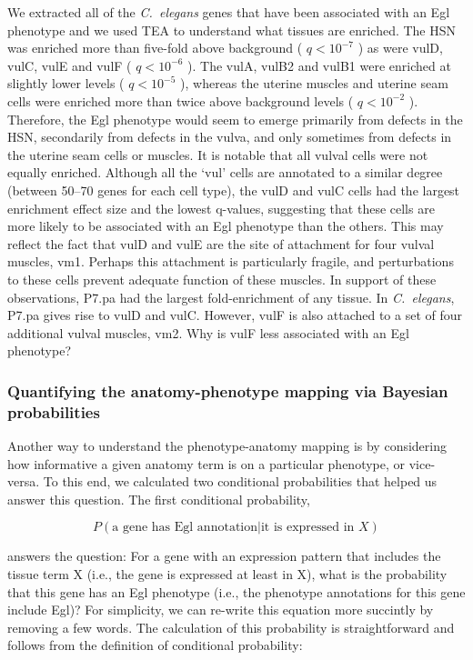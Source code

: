 \documentclass[10pt,letterpaper,twocolumn]{article}
\newcommand{\cel}{\emph{C.~elegans}}
\newcommand{\qval}[1]{
                      \ensuremath{
                                  q<10^{-#1}
                                  }
                      }
\begin{document}
We extracted all of the \cel{} genes that have been associated with an Egl
phenotype and we used TEA to understand what tissues are enriched. The HSN
was enriched more than five-fold above background (\qval{7}) as were vulD, vulC,
vulE and vulF (\qval{6}). The vulA, vulB2 and vulB1 were
enriched at slightly lower levels (\qval{5}), whereas the uterine muscles and
uterine seam cells were enriched more than twice above background levels
(\qval{2}).
Therefore, the Egl phenotype would seem to emerge primarily from defects in the
HSN, secondarily from defects in the vulva, and only sometimes from defects in the
uterine seam cells or muscles. It is notable that all vulval cells were not equally
enriched. Although all the `vul' cells are annotated to a similar degree (between
50--70 genes for each cell type), the vulD and vulC cells had the largest
enrichment effect size and the lowest q-values, suggesting that these cells
are more likely to be associated with an Egl phenotype than the others. This may
reflect the fact that vulD and vulE are the site of attachment for four vulval
muscles, vm1. Perhaps this attachment is particularly fragile, and perturbations
to these cells prevent adequate function of these muscles. In support of these
observations, P7.pa had the largest fold-enrichment of any tissue. In \cel{},
P7.pa gives rise to vulD and vulC. However, vulF is
also attached to a set of four additional vulval muscles, vm2. Why
is vulF less associated with an Egl phenotype?

\subsubsection*{Quantifying the anatomy-phenotype
                mapping via Bayesian probabilities}
Another way to understand the phenotype-anatomy mapping is by considering
how informative a given anatomy term is on a particular phenotype, or vice-versa.
To this end, we calculated two conditional probabilities that helped us answer
this question. The first conditional probability,

\begin{equation}
  P( \text{a gene has Egl annotation} | \text{it is expressed in } X)
\end{equation}

answers the question: For a gene with an expression pattern that includes the
tissue term X (i.e., the gene is expressed at least in X), what is the probability
that this gene has an Egl phenotype (i.e., the phenotype annotations for this
gene include Egl)? For simplicity, we can re-write this equation more succintly
by removing a few words. The calculation of this probability is straightforward
and follows from the definition of conditional probability:
\end{document}
